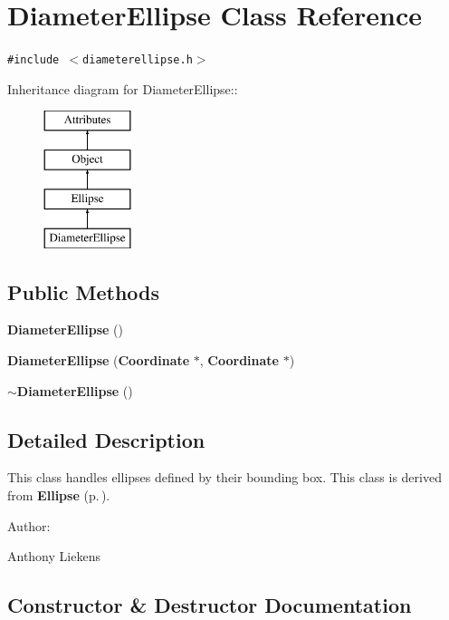 \section{Diameter\-Ellipse Class Reference}
\label{classDiameterEllipse}
{\tt \#include $<$diameterellipse.h$>$}

Inheritance diagram for Diameter\-Ellipse::\begin{figure}[H]
\begin{center}
\leavevmode
\includegraphics[height=4cm]{classDiameterEllipse}
\end{center}
\end{figure}
\subsection*{Public Methods}
\begin{CompactItemize}
\item 
{\bf Diameter\-Ellipse} ()
\item 
{\bf Diameter\-Ellipse} ({\bf Coordinate} $\ast$, {\bf Coordinate} $\ast$)
\item 
{\bf $\sim$Diameter\-Ellipse} ()
\end{CompactItemize}


\subsection{Detailed Description}
This class handles ellipses defined by their bounding box. This class is derived from {\bf Ellipse} {\rm (p.\,\pageref{classEllipse})}. \begin{Desc}
\item[Author: ]\par
Anthony Liekens \end{Desc}




\subsection{Constructor \& Destructor Documentation}
